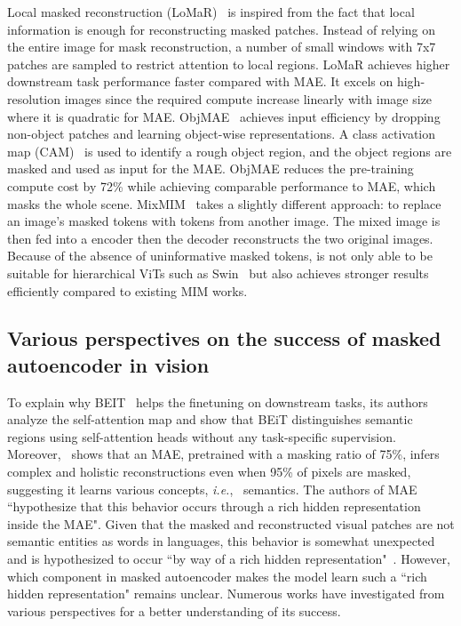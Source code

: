 \documentclass[10pt,journal,compsoc]{IEEEtran}
\begin{document}
Local masked reconstruction (LoMaR)~\cite{chen2022efficient} is inspired from the fact that local information is enough for reconstructing masked patches. Instead of relying on the entire image for mask reconstruction, a number of small windows with 7x7 patches are sampled to restrict attention to local regions. LoMaR achieves higher downstream task performance faster compared with MAE. It excels on high-resolution images since the required compute increase linearly with image size where it is quadratic for MAE. ObjMAE~\cite{wu2022object} achieves input efficiency by dropping non-object patches and learning object-wise representations. A class activation map (CAM)~\cite{zhou2016learning} is used to identify a rough object region, and the object regions are masked and used as input for the MAE. ObjMAE reduces the pre-training compute cost by 72\% while achieving comparable performance to MAE, which masks the whole scene. MixMIM~\cite{liu2022mixmim} takes a slightly different approach: to replace an image's masked tokens with tokens from another image. The mixed image is then fed into a encoder then the decoder reconstructs the two original images. Because of the absence of uninformative masked tokens, \cite{liu2022mixmim} is not only able to be suitable for hierarchical ViTs such as Swin~\cite{liu2021swin} but also achieves stronger results efficiently compared to existing MIM works.



\subsection{Various perspectives on the success of masked autoencoder in vision} 
To explain why BEIT~\cite{bao2022beit} helps the finetuning on downstream tasks, its authors analyze the self-attention map and show that BEiT distinguishes semantic regions using self-attention heads without any task-specific supervision. Moreover,~\cite{he2022masked} shows that an MAE, pretrained with a masking ratio of 75\%, infers complex and holistic reconstructions even when 95\% of pixels are masked, suggesting it learns various concepts, \textit{i.e.}, \ semantics. The authors of MAE~\cite{he2022masked} ``hypothesize that this behavior occurs through a rich hidden representation inside the MAE". Given that the masked and reconstructed visual patches are not semantic entities as words in languages, this behavior is somewhat unexpected and is hypothesized to occur ``by way of a rich hidden representation"~\cite{he2022masked}. However, which component in masked autoencoder makes the model learn such a ``rich hidden representation" remains unclear. Numerous works have investigated from various perspectives for a better understanding of its success.
\end{document}
